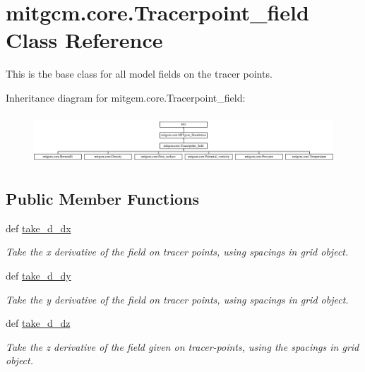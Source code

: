 \hypertarget{classmitgcm_1_1core_1_1Tracerpoint__field}{\section{mitgcm.\+core.\+Tracerpoint\+\_\+field Class Reference}
\label{classmitgcm_1_1core_1_1Tracerpoint__field}
}


This is the base class for all model fields on the tracer points.  


Inheritance diagram for mitgcm.\+core.\+Tracerpoint\+\_\+field\+:\begin{figure}[H]
\begin{center}
\leavevmode
\includegraphics[height=1.866667cm]{classmitgcm_1_1core_1_1Tracerpoint__field}
\end{center}
\end{figure}
\subsection*{Public Member Functions}
\begin{DoxyCompactItemize}
\item 
def \hyperlink{classmitgcm_1_1core_1_1Tracerpoint__field_a4e5ca6800530f2c8da4bc3d21ef4e50d}{take\+\_\+d\+\_\+dx}
\begin{DoxyCompactList}\small\item\em Take the x derivative of the field on tracer points, using spacings in grid object. \end{DoxyCompactList}\item 
def \hyperlink{classmitgcm_1_1core_1_1Tracerpoint__field_a5292f8f5c2110f476329806bee9315bf}{take\+\_\+d\+\_\+dy}
\begin{DoxyCompactList}\small\item\em Take the y derivative of the field on tracer points, using spacings in grid object. \end{DoxyCompactList}\item 
def \hyperlink{classmitgcm_1_1core_1_1Tracerpoint__field_aa54bc7f1fe31f946b3ed13cc1c66f22e}{take\+\_\+d\+\_\+dz}
\begin{DoxyCompactList}\small\item\em Take the z derivative of the field given on tracer-\/points, using the spacings in grid object. \end{DoxyCompactList}\end{DoxyCompactItemize}
